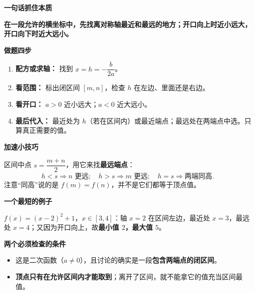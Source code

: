 \clearpage
\begin{summarybox}


\textbf{\textcolor{CSummary}{一句话抓住本质}}

\textbf{在一段允许的横坐标中，先找离对称轴最近和最远的地方；开口向上时近小远大，开口向下时近大远小。}

\medskip
\textbf{\textcolor{CSummary}{做题四步}}
\begin{enumerate}[leftmargin=*,itemsep=0.3em]
\item \textbf{配方或求轴：} 找到 $x=h=-\dfrac{b}{2a}$。
\item \textbf{看范围：} 标出闭区间 $[m,n]$，检查 $h$ 在左边、里面还是右边。
\item \textbf{看开口：} $a>0$ 近小远大；$a<0$ 近大远小。
\item \textbf{最后代入：} 最近处为 $h$（若在区间内）或最近端点；最远处在两端点中选。只算真正需要的值。
\end{enumerate}

\medskip
\end{summarybox}\clearpage\begin{summarybox}\textbf{\textcolor{CSummary}{加速小技巧}}

区间中点 $s=\dfrac{m+n}{2}$，用它来找\textbf{最远端点}：
\[
\boxed{h<s\Rightarrow n\text{ 更远};\quad h>s\Rightarrow m\text{ 更远};\quad h=s\Rightarrow\text{两端同高}.}
\]
注意“同高”说的是 $f(m)=f(n)$，并不是它们都等于顶点值。

\medskip
\textbf{\textcolor{CSummary}{一个最短的例子}}

$f(x)=(x-2)^2+1$，$x\in[3,4]$：轴 $x=2$ 在区间左边，最近处 $x=3$，最远处 $x=4$；又因为开口向上，故\textbf{最小值 $2$，最大值 $5$}。

\medskip
\textbf{\textcolor{CSummary}{两个必须检查的条件}}
\begin{itemize}[leftmargin=*,itemsep=0.3em]
\item 这是二次函数（$a\ne0$），且讨论的确实是一段\textbf{包含两端点的闭区间}。
\item \textbf{顶点只有在允许区间内才能取到}；离开了区间，就不能拿它的值充当区间最值。
\end{itemize}
\end{summarybox}
